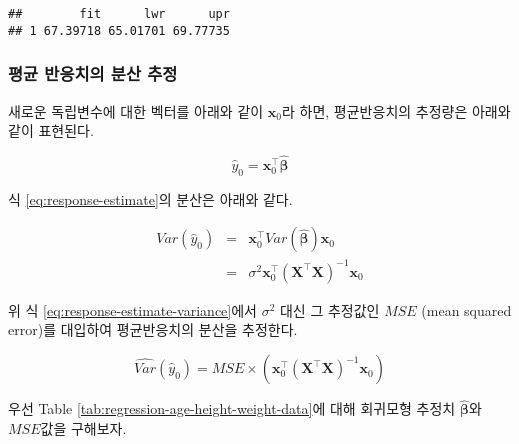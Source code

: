 \documentclass[
]{book}
\begin{document}
\begin{verbatim}
##        fit      lwr      upr
## 1 67.39718 65.01701 69.77735
\end{verbatim}

\hypertarget{regression-response-confidence-variance}{%
\subsubsection{평균 반응치의 분산 추정}\label{regression-response-confidence-variance}}

새로운 독립변수에 대한 벡터를 아래와 같이 \(\mathbf{x}_0\)라 하면, 평균반응치의 추정량은 아래와 같이 표현된다.

\begin{equation}
\hat{y}_0 = \mathbf{x}_0^\top \hat{\boldsymbol{\beta}} \label{eq:response-estimate}
\end{equation}

식 \eqref{eq:response-estimate}의 분산은 아래와 같다.

\begin{eqnarray}
Var(\hat{y}_0) &=& \mathbf{x}_0^\top Var(\hat{\boldsymbol{\beta}}) \mathbf{x}_0\\
&=& \sigma^2 \mathbf{x}_0^\top \left(\mathbf{X}^\top \mathbf{X}\right)^{-1} \mathbf{x}_0 \label{eq:response-estimate-variance}
\end{eqnarray}

위 식 \eqref{eq:response-estimate-variance}에서 \(\sigma^2\) 대신 그 추정값인 \(MSE\) (mean squared error)를 대입하여 평균반응치의 분산을 추정한다.

\begin{equation}
\hat{Var}(\hat{y}_0) = MSE \times \left( \mathbf{x}_0^\top \left(\mathbf{X}^\top \mathbf{X}\right)^{-1} \mathbf{x}_0 \right) \label{eq:response-estimate-variance-est}
\end{equation}

우선 Table \ref{tab:regression-age-height-weight-data}에 대해 회귀모형 추정치 \(\hat{\boldsymbol{\beta}}\)와 \(MSE\)값을 구해보자.
\end{document}
